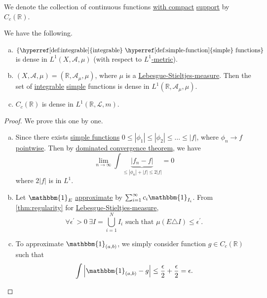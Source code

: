 \begin{notation}
	We denote the collection of continuous functions \underline{with compact} \hyperref[def:support]{support} by \(C_c(\mathbb{R} )\).
\end{notation}

\begin{theorem}
	We have the following.
	\begin{enumerate}[(a)]
		\item \(\{\text{\hyperref[def:integrable]{integrable} \hyperref[def:simple-function]{simple} functions} \}\) is dense in \(L^1(X, \mathcal{A} , \mu )\) (with respect to \hyperref[def:L-1-metric]{\(L^1\)-metric}).
		\item \((X, \mathcal{A} , \mu ) = (\mathbb{R} , \mathcal{A} _\mu , \mu )\), where \(\mu\) is a \hyperref[def:Lebesgue-Stieltjes-measure]{Lebesgue-Stieltjes-measure}. Then the set of \hyperref[def:integrable]{integrable} \hyperref[def:simple-function]{simple} functions is dense in \(L^1(\mathbb{R} , \mathcal{A} _\mu , \mu )\).
		\item \(C_c(\mathbb{R} )\) is dense in \(L^1(\mathbb{R} , \hyperref[def:Lebesgue-measure]{\mathcal{L} , m})\).
	\end{enumerate}
\end{theorem}
\begin{proof}
	We prove this one by one.
	\begin{enumerate}[(a)]
		\item Since there exists \hyperref[def:simple-function]{simple functions} \(0\leq \left\vert \phi _1 \right\vert \leq \left\vert \phi _2 \right\vert\leq \dots \leq \left\vert f \right\vert  \), where \(\phi _{n}\to f\) \hyperref[def:pointwise-convergence]{pointwise}. Then by \hyperref[thm:DCT]{dominated convergence theorem}, we have
		      \[
			      \lim_{n \to \infty} \int \underbrace{\left\vert f_{n} - f\right\vert }_{\leq \left\vert \phi _{n} \right\vert + \left\vert f  \right\vert\leq 2\left\vert f \right\vert } = 0
		      \]
		      where \(2\left\vert f \right\vert \) is in \(L^1\).
		\item Let \(\mathbbm{1}_{E} \) \underline{approximate} by \(\sum_{i=1}^{\infty} c_{i}\mathbbm{1}_{I_{i}} \). From \autoref{thm:regularity} for \hyperref[def:Lebesgue-Stieltjes-measure]{Lebesgue-Stieltjes-measure},
		      \[
			      \forall \epsilon ^\prime >0\ \exists I = \bigcup_{i=1}^{N} I_{i}\text{ such that } \mu (E\triangle I)\leq \epsilon ^\prime .
		      \]
		\item To approximate \(\mathbbm{1}_{(a, b)} \), we simply consider function \(g\in C_c(\mathbb{R} )\) such that
		      \[
			      \int \left\vert \mathbbm{1}_{(a, b)} - g \right\vert \leq \frac{\epsilon}{2} + \frac{\epsilon}{2} = \epsilon .
		      \]
	\end{enumerate}
\end{proof}